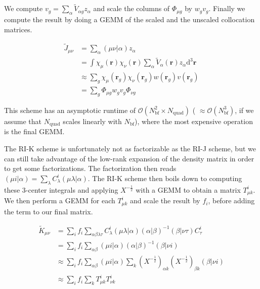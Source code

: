 \documentclass{article}
\begin{document}
We compute \( v_g =  \sum_{\alpha }
\tilde V_{\alpha g} z_\alpha  \) and scale the columns of \(
\Phi_{\mu g} \) by \( w_g v_g \). Finally we compute the result by
doing a GEMM of the scaled and the unscaled collocation matrices.

\begin{align}
  \tilde{J}_{\mu  \nu }
  &= \sum_{\alpha } (\mu \nu |\alpha ) z_\alpha \\
  &= \int \chi_\mu(\mathbf r) \chi_\nu(\mathbf r) \sum_{\alpha }
  \tilde V_\alpha(\mathbf r) z_\alpha \mathrm d^3 \mathbf r \\
  &\approx   \sum_{g}\chi_\mu(\mathbf{r}_g)
  \chi_\nu(\mathbf{r}_g) w(\mathbf{r}_g)  v(\mathbf{r}_g)\\
  &= \sum_g \Phi_{\mu g} w_g v_g \Phi_{\nu g}
\end{align}

This scheme has an asymptotic runtime of \( \mathcal O(N_\text{bf}^2 \times
N_\text{quad} )\) ( \( \approx \mathcal O(N_\text{bf}^3)\), if we assume that
\( N_\text{quad} \) scales linearly with \( N_\text{bf}  \)), where the
most expensive operation is the final GEMM.

The RI-K scheme is unfortunately not as factorizable as the RI-J
scheme, but we can still take advantage of the low-rank expansion of
the density matrix in order to get some factorizations. The
factorization then reads \( (\mu i | \alpha ) =  \sum_\lambda
C^i_{\lambda}(\mu \lambda |\alpha ) \). The RI-K scheme then boils
down to computing these 3-center integrals and applying \(
X^{-\frac{1}{2}} \) with a GEMM to obtain a matrix \( T^i_{\mu k} \).
We then perform a GEMM for each \( T^i_{\mu k} \) and scale the
result by \( f_i \), before adding the term to our final matrix.

\begin{align}
  \tilde K_{\mu  \nu }
  &= \sum_i f_i \sum_{\alpha \beta \lambda \tau}
  C_{\lambda}^i
  (\mu \lambda  | \alpha)(\alpha |
  \beta)^{-1} (\beta|\nu\tau) C_{\tau }^i \\
  &= \sum_i f_i \sum_{\alpha \beta }
  (\mu i | \alpha)(\alpha |
  \beta)^{-1} (\beta|\nu i)  \\
  &\approx \sum_i f_i \sum_{\alpha \beta }
  (\mu i | \alpha) \sum_k (X^{-\frac{1}{2}})_{\alpha k}
  (X^{-\frac{1}{2}})_{\beta k} (\beta|\nu i) \\
  &\approx \sum_i f_i \sum_k T^{i}_{\mu  k }  T^{i}_{\nu  k }
  \label{eq:exchange_rearranged}
\end{align}
\end{document}
